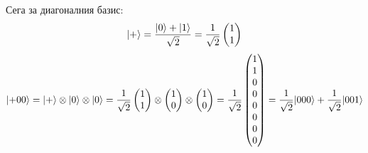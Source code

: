 \documentclass[11pt,oneside,a4paper]{article}
\begin{document}
Сега за диагоналния базис:
\begin{equation}
    {\left\vert{+}\right\rangle} = \frac{{\left\vert{0}\right\rangle} + {\left\vert{1}\right\rangle}}{\sqrt{2}} = \frac{1}{\sqrt{2}}\begin{pmatrix}1\\1\end{pmatrix}
\end{equation}
\begin{equation}
    {\left\vert{+00}\right\rangle} = {\left\vert{+}\right\rangle} \otimes {\left\vert{0}\right\rangle} \otimes {\left\vert{0}\right\rangle} = 
    \frac{1}{\sqrt{2}}\begin{pmatrix}1\\1\end{pmatrix}
    \otimes \begin{pmatrix}1\\0\end{pmatrix}
    \otimes \begin{pmatrix}1\\0\end{pmatrix}
    = \frac{1}{\sqrt{2}} \begin{pmatrix}1\\1\\0\\0\\0\\0\\0\\0\end{pmatrix} 
    = \frac{1}{\sqrt{2}}{\left\vert{000}\right\rangle} + \frac{1}{\sqrt{2}}{\left\vert{001}\right\rangle}
\end{equation}
\end{document}
